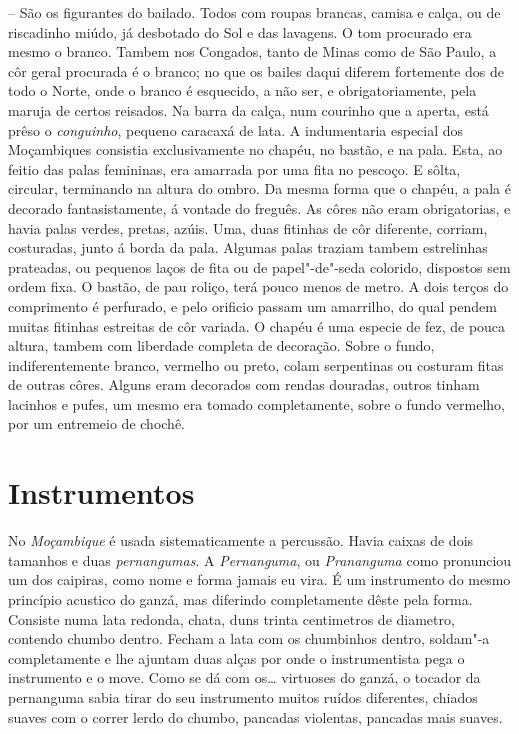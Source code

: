  -- São os figurantes do bailado. Todos com roupas
brancas, camisa e calça, ou de riscadinho miúdo, já desbotado do Sol e
das lavagens. O tom procurado era mesmo o branco. Tambem nos Congados,
tanto de Minas como de São Paulo, a côr geral procurada é o branco; no
que os bailes daqui diferem fortemente dos de todo o Norte, onde o
branco é esquecido, a não ser, e obrigatoriamente, pela maruja de certos
reisados. Na barra da calça, num courinho que a aperta, está prêso o
\emph{conguinho}, pequeno caracaxá de lata. A indumentaria especial dos
Moçambiques consistia exclusivamente no chapéu, no bastão, e na pala.
Esta, ao feitio das palas femininas, era amarrada por uma fita no
pescoço. E sôlta, circular, terminando na altura do ombro. Da mesma
forma que o chapéu, a pala é decorado fantasistamente, á vontade do
freguês. As côres não eram obrigatorias, e havia palas verdes, pretas,
azúis. Uma, duas fitinhas de côr diferente, corriam, costuradas, junto á
borda da pala. Algumas palas traziam tambem estrelinhas prateadas, ou
pequenos laços de fita ou de papel"-de"-seda colorido, dispostos sem ordem
fixa. O bastão, de pau roliço, terá pouco menos de metro. A dois terços
do comprimento é perfurado, e pelo orificio passam um amarrilho, do qual
pendem muitas fitinhas estreitas de côr variada. O chapéu é uma especie
de fez, de pouca altura, tambem com liberdade completa de decoração.
Sobre o fundo, indiferentemente branco, vermelho ou preto, colam
serpentinas ou costuram fitas de outras côres. Alguns eram decorados com
rendas douradas, outros tinham lacinhos e pufes, um mesmo era tomado
completamente, sobre o fundo vermelho, por um entremeio de chochê.

\section{Instrumentos}

No \emph{Moçambique} é usada sistematicamente a percussão. Havia caixas
de dois tamanhos e duas \emph{pernangumas}. A \emph{Pernanguma}, ou
\emph{Prananguma} como pronunciou um dos caipiras, como nome e forma
jamais eu vira. É um instrumento do mesmo princípio acustico do ganzá,
mas diferindo completamente dêste pela forma. Consiste numa lata
redonda, chata, duns trinta centimetros de diametro, contendo chumbo
dentro. Fecham a lata com os chumbinhos dentro, soldam"-a completamente e
lhe ajuntam duas alças por onde o instrumentista pega o instrumento e o
move. Como se dá com os\ldots{} virtuoses do ganzá, o tocador da pernanguma
sabia tirar do seu instrumento muitos ruídos diferentes, chiados suaves
com o correr lerdo do chumbo, pancadas violentas, pancadas mais suaves.

